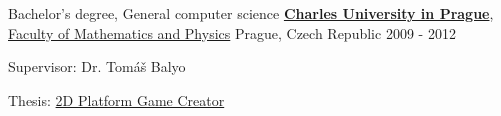 \begin{cventries}
  \cventry
{Bachelor's degree, General computer science} %
{\href{http://cuni.cz}{\textbf{Charles University in Prague}}, \href{http://www.mff.cuni.cz}
	{Faculty of Mathematics and Physics}} %
{Prague, Czech Republic} %
{2009 - 2012} %
{
	\begin{cvitems} %
		\item {Supervisor: Dr. Tomáš Balyo}
		\item {Thesis: \href{http://milanrybar.cz/2pgc}{2D Platform Game Creator} 
		}
	\end{cvitems}
}

\end{cventries}
